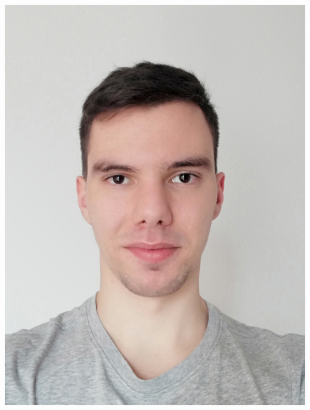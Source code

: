     \begin{leftcolumn}
    \includegraphics[width=\linewidth]{IMG_20220519_174910.jpg}	%
    

    \vfill\null

     \\
     \\
     \\
     \\
     \\
     \\
     \\
    

\end{leftcolumn}
